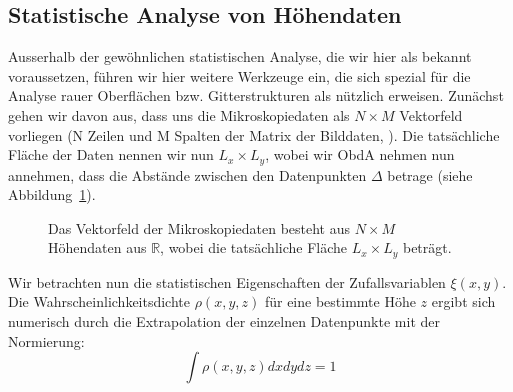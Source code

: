 \subsection{Statistische Analyse von Höhendaten}
\usetikzlibrary{decorations.pathreplacing}
Ausserhalb der gewöhnlichen statistischen Analyse, die wir
hier als bekannt voraussetzen, führen wir hier weitere Werkzeuge
ein, die sich spezial für die Analyse rauer Oberflächen bzw. 
Gitterstrukturen als nützlich erweisen\cite{gwyddion}. Zunächst
gehen wir davon aus, dass uns die Mikroskopiedaten als 
$N \times M$ Vektorfeld vorliegen (N Zeilen und M Spalten der
Matrix der Bilddaten, ). Die tatsächliche Fläche der Daten
nennen wir nun $L_x \times L_y$, wobei 
wir ObdA nehmen nun annehmen, dass die Abstände
zwischen den Datenpunkten $\Delta$ betrage 
(siehe Abbildung~\ref{fig:stat1}). 

\begin{figure}
\caption{Das Vektorfeld der Mikroskopiedaten besteht aus 
$N \times M$ Höhendaten aus $\mathbb{R}$, wobei die tatsächliche 
Fläche $L_x \times L_y$ beträgt.}
\label{fig:stat1}
\end{figure}
Wir betrachten nun 
die statistischen Eigenschaften der Zufallsvariablen $\xi(x,y)$. 
Die Wahrscheinlichkeitsdichte $\rho(x,y,z)$ für eine 
bestimmte Höhe $z$ ergibt sich numerisch
durch die Extrapolation der einzelnen Datenpunkte mit der Normierung:
\begin{equation*}
\int \rho(x,y,z) dx dy dz = 1
\end{equation*}
